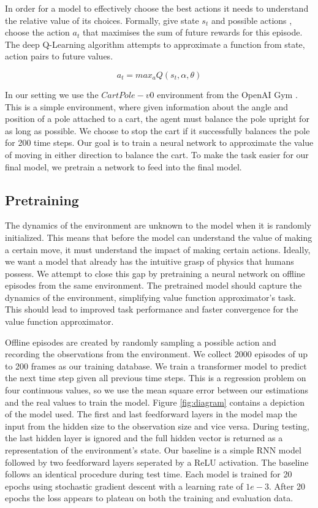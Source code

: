 \documentclass[11pt, twocolumn]{article}
\begin{document}
In order for a model to effectively choose the best actions it needs to understand the relative value of its choices. Formally, give state $s_t$ and possible actions , choose the action $a_t$ that maximises the sum of future rewards for this episode. The deep Q-Learning algorithm attempts to approximate a function from state, action pairs to future values. 

\begin{equation}
a_t = max_a Q (s_t, \alpha, \theta)
\end{equation}

In our setting we use the $CartPole-v0$ environment from the OpenAI Gym \cite{brockman2016openai}. This is a simple environment, where given information about the angle and position of a pole attached to a cart, the agent must balance the pole upright for as long as possible. We choose to stop the cart if it successfully balances the pole for 200 time steps. Our goal is to train a neural network to approximate the value of moving in either direction to balance the cart. To make the task easier for our final model, we pretrain a network to feed into the final model.

\subsection{Pretraining}
The dynamics of the environment are unknown to the model when it is randomly initialized. This means that before the model can understand the value of making a certain move, it must understand the impact of making certain actions. Ideally, we want a model that already has the intuitive grasp of physics that humans possess. We attempt to close this gap by pretraining a neural network on offline episodes from the same environment. The pretrained model should capture the dynamics of the environment, simplifying value function approximator's task. This should lead to improved task performance and faster convergence for the value function approximator.

Offline episodes are created by randomly sampling a possible action and recording the observations from the environment. We collect 2000 episodes of up to 200 frames as our training database. We train a transformer model to predict the next time step given all previous time steps. This is a regression problem on four continuous values, so we use the mean square error between our estimations and the real values to train the model. Figure \ref{fig:diagram} contains a depiction of the model used. The first and last feedforward layers in the model map the input from the hidden size to the observation size and vice versa. During testing, the last hidden layer is ignored and the full hidden vector is returned as a representation of the environment's state. Our baseline is a simple RNN model followed by two feedforward layers seperated by a ReLU activation. The baseline follows an identical procedure during test time. Each model is trained for 20 epochs using stochastic gradient descent with a learning rate of $1e-3$. After 20 epochs the loss appears to plateau on both the training and evaluation data.
\end{document}
